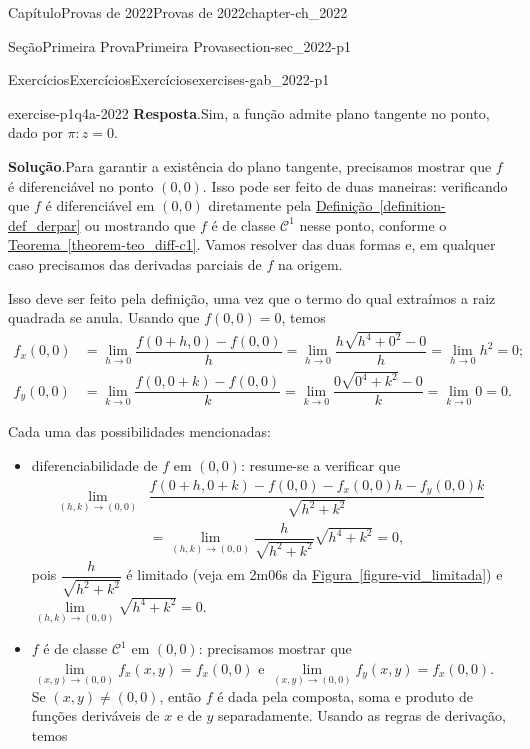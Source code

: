 \documentclass[oneside,10pt,]{book}
\newcommand{\blocktitlefont}{\relax}
\newcommand{\xreffont}{\relax}
\numberwithin{equation}{section}
\begin{document}
\begin{chapterptx}{Capítulo}{Provas de 2022}{}{Provas de 2022}{}{}{chapter-ch_2022}
\begin{sectionptx}{Seção}{Primeira Prova}{}{Primeira Prova}{}{}{section-sec_2022-p1}
\begin{exercises-subsection-numberless}{Exercícios}{Exercícios}{}{Exercícios}{}{}{exercises-gab_2022-p1}
\begin{divisionexercise}{4}{}{}{exercise-p1q4a-2022}
\noindent\textbf{\blocktitlefont Resposta}.\hypertarget{answer-p1q4a-2022-b}{}\quad{}Sim, a função admite plano tangente no ponto, dado por \(\pi\colon z=0\).\par\smallskip%
\noindent\textbf{\blocktitlefont Solução}.\hypertarget{solution-p1q4a-2022-c}{}\quad{}Para garantir a existência do plano tangente, precisamos mostrar que \(f\) é diferenciável no ponto \((0,0)\). Isso pode ser feito de duas maneiras: verificando que \(f\) é diferenciável em \((0,0)\) diretamente pela \hyperref[definition-def_derpar]{Definição~{\xreffont\ref{definition-def_derpar}}} ou mostrando que \(f\) é de classe \(\mathscr{C}^1\) nesse ponto, conforme o \hyperref[theorem-teo_diff-c1]{Teorema~{\xreffont\ref{theorem-teo_diff-c1}}}. Vamos resolver das duas formas e, em qualquer caso precisamos das derivadas parciais de \(f\) na origem.%
\par
Isso deve ser feito pela definição, uma vez que o termo do qual extraímos a raiz quadrada se anula. Usando que \(f(0,0)=0\), temos%
\begin{align}
f_x(0,0)
&=\lim\limits_{h\to 0}\dfrac{f(0+h,0)-f(0,0)}{h}
=\lim\limits_{h\to 0}\dfrac{h\sqrt{h^4+0^2}-0}{h}
=\lim\limits_{h\to 0}h^2=0;\label{mrow-p1aq4fxorig}\\
f_y(0,0)
&=\lim\limits_{k\to 0}\dfrac{f(0,0+k)-f(0,0)}{k}
=\lim\limits_{k\to 0}\dfrac{0\sqrt{0^4+k^2}-0}{k}
=\lim\limits_{k\to 0}0 =0.\label{mrow-p1aq4fyorig}
\end{align}
%
\par
Cada uma das possibilidades mencionadas:%
\begin{itemize}[label=\textbullet]
\item{}diferenciabilidade de \(f\) em \((0,0)\): resume-se a verificar que%
\begin{align*}
\lim\limits_{(h,k)\to(0,0)}&\dfrac{f(0+h,0+k)-f(0,0)
-f_x(0,0)h-f_y(0,0)k}{\sqrt{h^2+k^2}}\\
&=\lim\limits_{(h,k)\to(0,0)}
\dfrac{h}{\sqrt{h^2+k^2}}\sqrt{h^4+k^2}=0,
\end{align*}
pois \(\dfrac{h}{\sqrt{h^2+k^2}}\) é limitado (veja em 2m06s da \hyperref[figure-vid_limitada]{Figura~{\xreffont\ref{figure-vid_limitada}}}) e \(\lim\limits_{(h,k)\to(0,0)}\sqrt{h^4+k^2}=0\).%
\item{}\(f\) é de classe \(\mathscr{C}^1\) em \((0,0)\): precisamos mostrar que \(\lim\limits_{(x,y)\to(0,0)}f_x(x,y)=f_x(0,0)\) e \(\lim\limits_{(x,y)\to(0,0)}f_y(x,y)=f_x(0,0)\). Se \((x,y)\neq (0,0)\), então \(f\) é dada pela composta, soma e produto de funções deriváveis de \(x\) e de \(y\) separadamente. Usando as regras de derivação, temos%

\end{itemize}
\end{divisionexercise}
\end{exercises-subsection-numberless}
\end{sectionptx}
\end{chapterptx}
\end{document}
